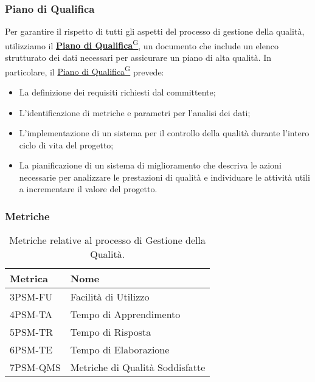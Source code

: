 \subsubsection{Piano di Qualifica}
Per garantire il rispetto di tutti gli aspetti del processo di gestione della qualità, utilizziamo il 
\href{https://code7crusaders.github.io/docs/PB/documentazione_interna/glossario.html#piano-di-qualifica}{\textbf{Piano di Qualifica}\textsuperscript{G}}, un documento che include un elenco strutturato dei dati necessari per assicurare un piano di alta qualità. In particolare, il \href{https://code7crusaders.github.io/docs/PB/documentazione_interna/glossario.html#piano-di-qualifica}{Piano di Qualifica\textsuperscript{G}} prevede:  
\begin{itemize}
    \item La definizione dei requisiti richiesti dal committente;
    \item L’identificazione di metriche e parametri per l’analisi dei dati;
    \item L’implementazione di un sistema per il controllo della qualità durante l’intero ciclo di vita del progetto;
    \item La pianificazione di un sistema di miglioramento che descriva le azioni necessarie per analizzare le prestazioni di qualità e individuare le attività utili a incrementare il valore del progetto.
\end{itemize}


\subsubsection{Metriche}
\begin{table}[h!]
    \centering
    \renewcommand{\arraystretch}{1.5}
    \begin{tabular}{|l|l|}
        \hline
        \textbf{Metrica} & \textbf{Nome} \\
        \hline
        3PSM-FU & Facilità di Utilizzo \\
        \hline
        4PSM-TA & Tempo di Apprendimento \\
        \hline
        5PSM-TR & Tempo di Risposta \\
        \hline
        6PSM-TE & Tempo di Elaborazione\\
        \hline
        7PSM-QMS & Metriche di Qualità Soddisfatte \\
        \hline
    \end{tabular}
    \caption{Metriche relative al processo di Gestione della Qualità.}
\end{table}











